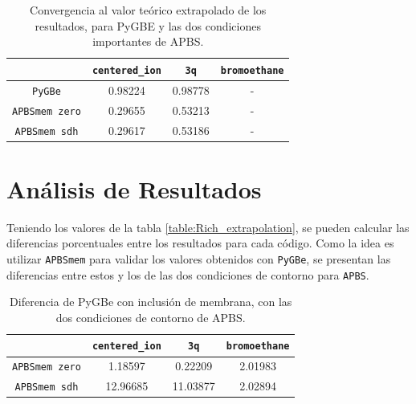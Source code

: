 \documentclass[12pt, twoside, onehalfspace, numbers, spanish]{ezthesis}
\numberwithin{equation}{section}
\begin{document}
\begin{table}[h]
	\centering
	\caption{Convergencia al valor teórico extrapolado de los resultados, para PyGBE y las dos condiciones importantes de APBS.}
	\def\arraystretch{1.2}
	\begin{tabular}{|c|ccc|}\hline
		& \texttt{centered\_ion} & \texttt{3q} & \texttt{bromoethane} \\ \hline
		\texttt{PyGBe} & 0.98224 & 0.98778 & - \\ \hline
		\texttt{APBSmem zero} & 0.29655 & 0.53213 & - \\ \hline
		\texttt{APBSmem sdh} & 0.29617 & 0.53186 & - \\ \hline
	\end{tabular}\label{table:Convergence_ratings}
\end{table}

\section{Análisis de Resultados}\label{Sec:analisis_resultados}

Teniendo los valores de la tabla \ref{table:Rich_extrapolation}, se pueden calcular las diferencias porcentuales entre los resultados para cada código. Como la idea es utilizar \texttt{APBSmem} para validar los valores obtenidos con \texttt{PyGBe}, se presentan las diferencias entre estos y los de las dos condiciones de contorno para \texttt{APBS}.

\begin{table}[h]
	\centering
	\caption{Diferencia de PyGBe con inclusión de membrana, con las dos condiciones de contorno de APBS.}
	\def\arraystretch{1.2}
	\begin{tabular}{|c|ccc|}\hline
		& \texttt{centered\_ion} & \texttt{3q} & \texttt{bromoethane} \\ \hline
		\texttt{APBSmem zero} & 1.18597 & 0.22209 & 2.01983 \\ \hline
		\texttt{APBSmem sdh} & 12.96685 & 11.03877 & 2.02894 \\ \hline
	\end{tabular}\label{table:Percent_Error}
\end{table}
\end{document}
